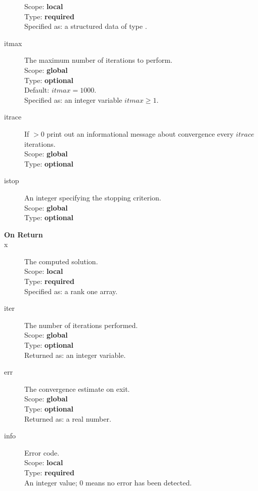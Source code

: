 \begin{description}
Scope: {\bf local} \\
Type: {\bf required}\\
Specified as: a structured data of type \descdata.
\item[itmax]  The maximum number of iterations to perform.\\
Scope: {\bf global} \\
Type: {\bf optional}\\
Default: $itmax = 1000$.\\
Specified as: an integer variable $itmax \ge 1$.
\item[itrace] If $>0$  print out an informational message about
  convergence  every $itrace$ iterations.\\ 
Scope: {\bf global} \\
Type: {\bf optional}\\
\item[istop]  An integer specifying the stopping criterion.\\
Scope: {\bf global} \\
Type: {\bf optional}\\

\item[\bf On Return] 
\item[x] The computed solution. \\
Scope: {\bf local} \\
Type: {\bf required}\\
Specified as: a rank one array.
\item[iter]  The number of iterations performed.\\
Scope: {\bf global} \\
Type: {\bf optional}\\
Returned  as: an integer variable.
\item[err]  The convergence estimate on exit.\\
Scope: {\bf global} \\
Type: {\bf optional}\\
Returned  as: a real number.
\item[info] Error code.\\
Scope: {\bf local} \\
Type: {\bf required} \\
An integer value; 0 means no error has been detected. 
\end{description}


